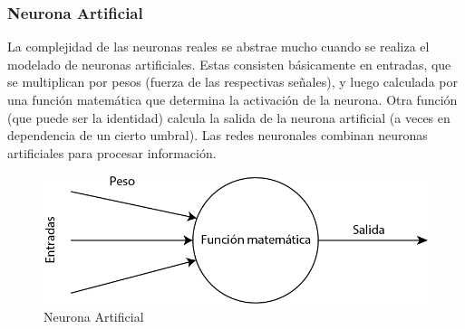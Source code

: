 \documentclass[12pt, a4paper, titlepage]{report}
\begin{document}
						\subsubsection*{Neurona Artificial}
						La complejidad de las neuronas reales se abstrae mucho cuando se realiza el modelado de neuronas artificiales. Estas consisten básicamente en entradas, que se multiplican por pesos (fuerza de las respectivas señales), y luego calculada por una función matemática que determina la activación de la neurona. Otra función (que puede ser la identidad) calcula la salida de la neurona artificial (a veces en dependencia de un cierto umbral). Las redes neuronales combinan neuronas artificiales para procesar información.\cite{refNeuronaArt}
						\begin{figure}[H] \caption{Neurona Artificial}
							\includegraphics[width=12cm]{./imagenes/MarcoTeorico/NeuronaArt.png}
							\centering 
						\end{figure}
\end{document}

